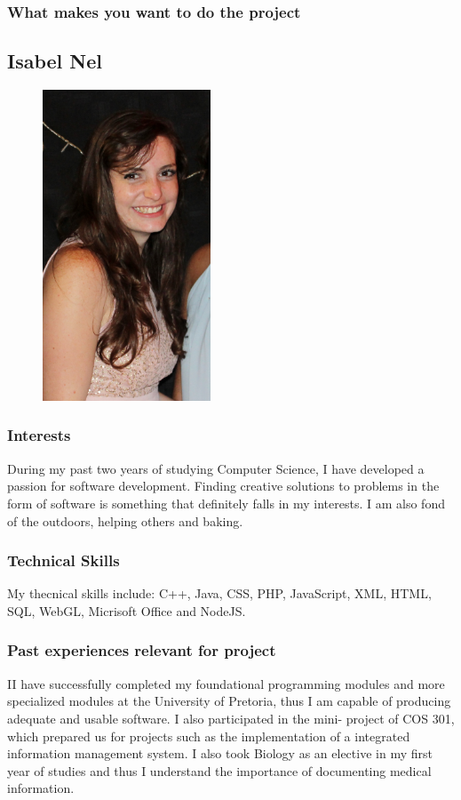 \documentclass[hidelinks, 12pt, oneside]{article}
\begin{document}
\subsubsection{What makes you want to do the project}

\subsection{Isabel Nel}

\begin{figure}[h!]
\centering
\includegraphics[width=50mm]{IsabelNel}
\end{figure}

\subsubsection{Interests}
During my past two years of studying Computer Science, I have developed a
passion for software development. Finding creative solutions to problems in
the form of software is something that definitely falls in my interests. I am
also fond of the outdoors, helping others and baking.

\subsubsection{Technical Skills}
My thecnical skills include: C++, Java, CSS, PHP, JavaScript, XML, HTML,
SQL, WebGL, Micrisoft Office and NodeJS.

\subsubsection{Past experiences relevant for project}
II have successfully completed my foundational programming modules and
more specialized modules at the University of Pretoria, thus I am capable
of producing adequate and usable software. I also participated in the mini-
project of COS 301, which prepared us for projects such as the implementation of a integrated information management system. I also took Biology as an elective in my first year of studies and thus I understand  the importance of documenting medical information.
\end{document}
